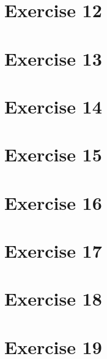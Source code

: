 \documentclass[12pt]{article}
\newcommand{\desc}[1]{\textit{#1} \vspace{1em}}
\begin{document}
\clearpage
\section*{Exercise 12}
\desc{}

\clearpage
\section*{Exercise 13}
\desc{}

\clearpage
\section*{Exercise 14}
\desc{}


\clearpage
\section*{Exercise 15}
\desc{}

\clearpage
\section*{Exercise 16}
\desc{}


\clearpage
\section*{Exercise 17}
\desc{}


\clearpage
\section*{Exercise 18}
\desc{}


\clearpage
\section*{Exercise 19}
\desc{}


\clearpage
\end{document}

